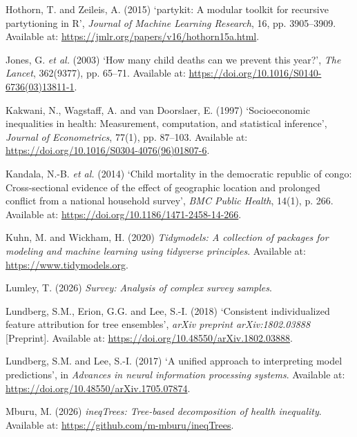 \documentclass[
  11pt,
  a4paper,
]{article}
\newlength{\cslhangindent}
\newenvironment{CSLReferences}[2] %
 {\begin{list}{}{%
  \setlength{\itemindent}{0pt}
  \setlength{\leftmargin}{0pt}
  \setlength{\parsep}{0pt}
  \ifodd #1
   \setlength{\leftmargin}{\cslhangindent}
   \setlength{\itemindent}{-1\cslhangindent}
  \fi
  \setlength{\itemsep}{#2\baselineskip}}}
 {\end{list}}
\begin{document}
\begin{CSLReferences}{0}{1}
Hothorn, T. and Zeileis, A. (2015) {`{partykit}: A modular toolkit for
recursive partytioning in {R}'}, \emph{Journal of Machine Learning
Research}, 16, pp. 3905--3909. Available at:
\url{https://jmlr.org/papers/v16/hothorn15a.html}.

Jones, G. \emph{et al.} (2003) {`How many child deaths can we prevent
this year?'}, \emph{The Lancet}, 362(9377), pp. 65--71. Available at:
\url{https://doi.org/10.1016/S0140-6736(03)13811-1}.

{Kakwani, N., Wagstaff, A. and van Doorslaer, E.} (1997) {`Socioeconomic
inequalities in health: Measurement, computation, and statistical
inference'}, \emph{Journal of Econometrics}, 77(1), pp. 87--103.
Available at: \url{https://doi.org/10.1016/S0304-4076(96)01807-6}.

Kandala, N.-B. \emph{et al.} (2014) {`Child mortality in the democratic
republic of congo: Cross-sectional evidence of the effect of geographic
location and prolonged conflict from a national household survey'},
\emph{BMC Public Health}, 14(1), p. 266. Available at:
\url{https://doi.org/10.1186/1471-2458-14-266}.

Kuhn, M. and Wickham, H. (2020) \emph{Tidymodels: A collection of
packages for modeling and machine learning using tidyverse principles}.
Available at: \url{https://www.tidymodels.org}.

Lumley, T. (2026) \emph{Survey: Analysis of complex survey samples}.

Lundberg, S.M., Erion, G.G. and Lee, S.-I. (2018) {`Consistent
individualized feature attribution for tree ensembles'}, \emph{arXiv
preprint arXiv:1802.03888} {[}Preprint{]}. Available at:
\url{https://doi.org/10.48550/arXiv.1802.03888}.

Lundberg, S.M. and Lee, S.-I. (2017) {`A unified approach to
interpreting model predictions'}, in \emph{Advances in neural
information processing systems}. Available at:
\url{https://doi.org/10.48550/arXiv.1705.07874}.

Mburu, M. (2026) \emph{ineqTrees: Tree-based decomposition of health
inequality}. Available at: \url{https://github.com/m-mburu/ineqTrees}.


\end{CSLReferences}
\end{document}
